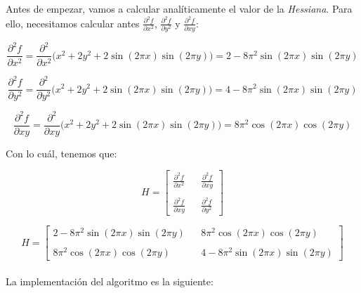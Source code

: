 \documentclass[11pt,a4paper]{article}
\begin{document}
Antes de empezar, vamos a calcular analíticamente el valor de la \textit{Hessiana}. Para ello, necesitamos calcular antes
$\frac{\partial^2 f}{\partial x^2}$, $\frac{\partial^2 f}{\partial y^2}$ y $\frac{\partial^2 f}{\partial xy}$:

\begin{equation}
\frac{\partial^2 f}{\partial x^2} = \frac{\partial^2}{\partial x^2} \Big(x^2 + 2y^2 + 2\sin(2 \pi x)\sin(2 \pi y)\Big) =
2 - 8 \pi ^ 2 \sin(2 \pi x)\sin(2 \pi y)
\end{equation}

\begin{equation}
\frac{\partial^2 f}{\partial y^2} = \frac{\partial^2}{\partial y^2} \Big(x^2 + 2y^2 + 2\sin(2 \pi x)\sin(2 \pi y)\Big) =
4 - 8 \pi ^ 2 \sin(2 \pi x)\sin(2 \pi y)
\end{equation}

\begin{equation}
\frac{\partial^2 f}{\partial xy} = \frac{\partial^2}{\partial xy} \Big(x^2 + 2y^2 + 2\sin(2 \pi x)\sin(2 \pi y)\Big) =
8 \pi ^ 2 \cos(2 \pi x)\cos(2 \pi y)
\end{equation}

Con lo cuál, tenemos que:

\begin{equation}
H =
\left[
{
\begin{array}{ccc}
	\frac{\partial^2 f}{\partial x^2} & & \frac{\partial^2 f}{\partial xy} \\
	\\
	\frac{\partial^2 f}{\partial xy} & & \frac{\partial^2 f}{\partial y^2}
\end{array}
}
\right]
\end{equation}

\begin{equation}
H =
\left[
{
\begin{array}{ccc}
	2 - 8 \pi ^ 2 \sin(2 \pi x)\sin(2 \pi y) & & 8 \pi ^ 2 \cos(2 \pi x)\cos(2 \pi y) \\
	\\
	8 \pi ^ 2 \cos(2 \pi x)\cos(2 \pi y) & & 4 - 8 \pi ^ 2 \sin(2 \pi x)\sin(2 \pi y)
\end{array}
}
\right]
\end{equation}\\

La implementación del algoritmo es la siguiente:
\end{document}
